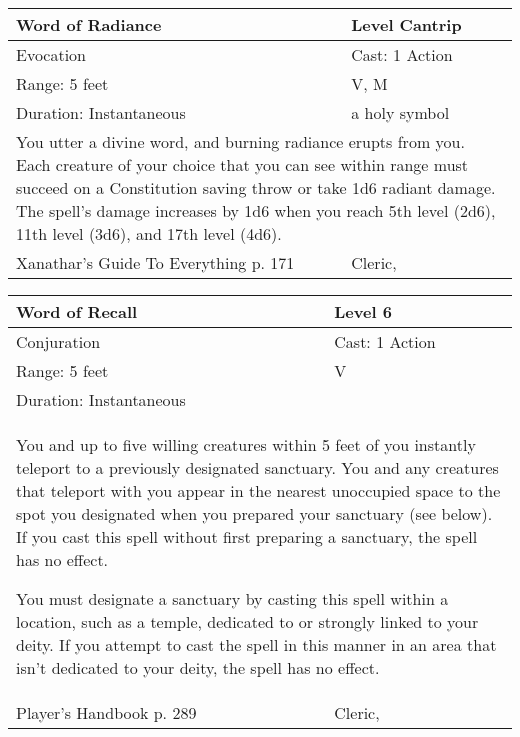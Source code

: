 \documentclass[11pt]{report}
\begin{document}
\begin{table}[H]
	\begin{tabular}{||p{6cm}|p{6cm}||}
		\hline\hline
		\bf{Word of Radiance} & Level Cantrip\\ \hline
		Evocation & Cast: 1 Action\\ \hline
		Range: 5 feet & V, M\\ \hline
		Duration: Instantaneous & a holy symbol\\ \hline
		\multicolumn{2}{||p{12cm}||}{You utter a divine word, and burning radiance erupts from you. Each creature of your choice that you can see within range must succeed on a Constitution saving throw or take 1d6 radiant damage.
The spell’s damage increases by 1d6 when you reach 5th level (2d6), 11th level (3d6), and 17th level (4d6).}\\ \hline
Xanathar's Guide To Everything p. 171 & Cleric, \\ \hline\hline
	\end{tabular}
\end{table}

\begin{table}[H]
	\begin{tabular}{||p{6cm}|p{6cm}||}
		\hline\hline
		\bf{Word of Recall} & Level 6\\ \hline
		Conjuration & Cast: 1 Action\\ \hline
		Range: 5 feet & V\\ \hline
		Duration: Instantaneous & \\ \hline
		\multicolumn{2}{||p{12cm}||}{You and up to five willing creatures within 5 feet of you instantly teleport to a previously designated sanctuary.
You and any creatures that teleport with you appear in the nearest unoccupied space to the spot you designated when you prepared your sanctuary (see below). If you cast this spell without first preparing a sanctuary, the spell has no effect.

You must designate a sanctuary by casting this spell within a location, such as a temple, dedicated to or strongly linked to your deity. If you attempt to cast the spell in this manner in an area that isn’t dedicated to your deity, the spell has no effect.}\\ \hline
Player's Handbook p. 289 & Cleric, \\ \hline\hline
	\end{tabular}
\end{table}
\end{document}
